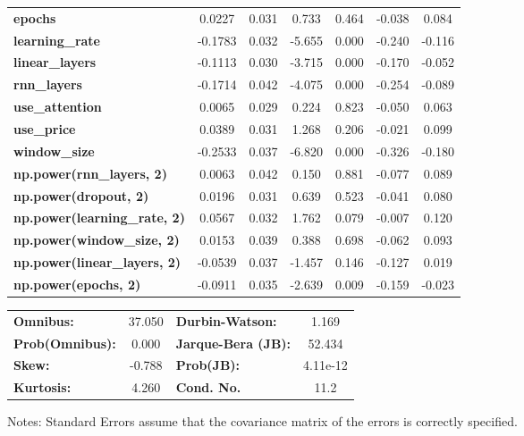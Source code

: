 \begin{center}
\begin{tabular}{lcccccc}
\textbf{epochs}                            &       0.0227  &        0.031     &     0.733  &         0.464        &       -0.038    &        0.084     \\
\textbf{learning\_rate}                    &      -0.1783  &        0.032     &    -5.655  &         0.000        &       -0.240    &       -0.116     \\
\textbf{linear\_layers}                    &      -0.1113  &        0.030     &    -3.715  &         0.000        &       -0.170    &       -0.052     \\
\textbf{rnn\_layers}                       &      -0.1714  &        0.042     &    -4.075  &         0.000        &       -0.254    &       -0.089     \\
\textbf{use\_attention}                    &       0.0065  &        0.029     &     0.224  &         0.823        &       -0.050    &        0.063     \\
\textbf{use\_price}                        &       0.0389  &        0.031     &     1.268  &         0.206        &       -0.021    &        0.099     \\
\textbf{window\_size}                      &      -0.2533  &        0.037     &    -6.820  &         0.000        &       -0.326    &       -0.180     \\
\textbf{np.power(rnn\_layers, 2)}          &       0.0063  &        0.042     &     0.150  &         0.881        &       -0.077    &        0.089     \\
\textbf{np.power(dropout, 2)}              &       0.0196  &        0.031     &     0.639  &         0.523        &       -0.041    &        0.080     \\
\textbf{np.power(learning\_rate, 2)}       &       0.0567  &        0.032     &     1.762  &         0.079        &       -0.007    &        0.120     \\
\textbf{np.power(window\_size, 2)}         &       0.0153  &        0.039     &     0.388  &         0.698        &       -0.062    &        0.093     \\
\textbf{np.power(linear\_layers, 2)}       &      -0.0539  &        0.037     &    -1.457  &         0.146        &       -0.127    &        0.019     \\
\textbf{np.power(epochs, 2)}               &      -0.0911  &        0.035     &    -2.639  &         0.009        &       -0.159    &       -0.023     \\
\bottomrule
\end{tabular}
\begin{tabular}{lclc}
\textbf{Omnibus:}       & 37.050 & \textbf{  Durbin-Watson:     } &    1.169  \\
\textbf{Prob(Omnibus):} &  0.000 & \textbf{  Jarque-Bera (JB):  } &   52.434  \\
\textbf{Skew:}          & -0.788 & \textbf{  Prob(JB):          } & 4.11e-12  \\
\textbf{Kurtosis:}      &  4.260 & \textbf{  Cond. No.          } &     11.2  \\
\bottomrule
\end{tabular}
\end{center}

Notes: \newline
 [1] Standard Errors assume that the covariance matrix of the errors is correctly specified.